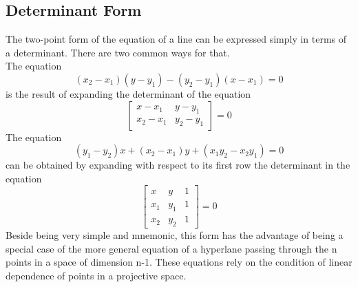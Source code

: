 \documentclass[a4paper, 12pt]{report}
\begin{document}
{         \subsection{Determinant Form}
          The two-point form of the equation of a line can be expressed simply in terms of a determinant. There are two common ways for that.\\
          The equation
          \begin{equation}
          (x_2 - x_1) (y - y_1) - (y_2 - y_1) (x - x_1) = 0
          \end{equation}
          is the result of expanding the determinant of the equation
          \begin{equation}
          \begin{bmatrix}
          x - x_1 & y - y_1\\
          x_2 - x_1 & y_2 - y_1
          \end{bmatrix}=0
          \end{equation}
           The equation 
          \begin{equation}
          (y_1 - y_2)x + (x_2 - x_1)y + (x_1 y_2 - x_2 y_1) = 0 
          \end{equation}
          can be obtained by expanding with respect to its first row the determinant in the equation
          \begin{equation}
          \begin{bmatrix}
          x & y & 1\\
          x_1 & y_1 & 1\\
          x_2 & y_2 & 1
          \end{bmatrix}=0
           \end{equation}
          Beside being very simple and mnemonic, this form has the advantage of being a special case of the more general equation of a hyperlane passing through the n points in a space of dimension n-1. These equations rely on the condition of linear dependence of points in a projective space.\\
          
}
\end{document}
